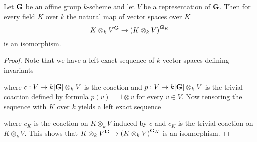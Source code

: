 \begin{proposition}\label{proposition:invariants_are_stable_under_change_of_base_field}
Let $\mathbf{G}$ be an affine group $k$-scheme and let $V$ be a representation of $\mathbf{G}$. Then for every field $K$ over $k$ the natural map of vector spaces over $K$
$$K\otimes_kV^{\mathbf{G}} \rightarrow \left(K\otimes_kV\right)^{\mathbf{G}_K}$$
is an isomorphism.
\end{proposition}
\begin{proof}
Note that we have a left exact sequence of $k$-vector spaces defining invariants
\begin{center}
\end{center}
where $c:V\rightarrow k[\mathbf{G}] \otimes_{k}V$ is the coaction and $p:V\rightarrow k[\mathbf{G}] \otimes_{k}V$ is the trivial coaction defined by formula $p(v)=1\otimes v$ for every $v \in V$. Now tensoring the sequence with $K$ over $k$ yields a left exact sequence
\begin{center}
\end{center}
where $c_K$ is the coaction on $K\otimes_kV$ induced by $c$ and $c_K$ is the trivial coaction on $K\otimes_kV$. This shows that $K\otimes_kV^{\mathbf{G}} \rightarrow \left(K\otimes_kV\right)^{\mathbf{G}_K}$ is an isomorphism.
\end{proof}

